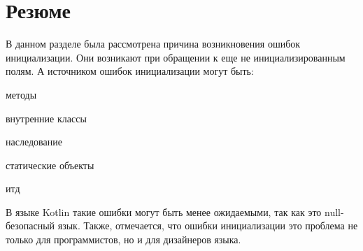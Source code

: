 \section{Резюме}\label{sec:проблема-резюме}

В данном разделе была рассмотрена причина возникновения ошибок инициализации.
Они возникают при обращении к еще не инициализированным полям.
А источником ошибок инициализации могут быть:
\begin{itemize*}
    \item методы
    \item внутренние классы
    \item наследование
    \item статические объекты
    \item итд
\end{itemize*}
В языке Kotlin такие ошибки могут быть менее ожидаемыми, так как это null-безопасный язык.
Также, отмечается, что ошибки инициализации это проблема не только для программистов, но и для дизайнеров языка.